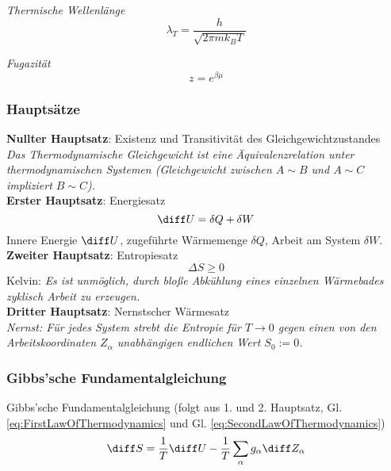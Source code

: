 \documentclass[11pt]{article}
\numberwithin{equation}{section}
\begin{document}
        \emph{Thermische Wellenlänge}
        \begin{equation}
          \lambda_T = \frac{h}{\sqrt{2\pi m k_B T}}
        \end{equation}

        \emph{Fugazität}
        \begin{equation}
          z = e^{\beta\mu}
        \end{equation}

      \subsubsection{Hauptsätze}
        \textbf{Nullter Hauptsatz}: Existenz und Transitivität des Gleichgewichtzustandes\\
          \indent \emph{Das Thermodynamische Gleichgewicht ist eine Äquivalenzrelation unter thermodynamischen Systemen (Gleichgewicht zwischen $A \sim B$ und $A \sim C$ impliziert $ B \sim C$).} \\
        \textbf{Erster Hauptsatz}: Energiesatz\\
          \begin{equation}
            \label{eq:FirstLawOfThermodynamics}
            \diff U = \delta Q + \delta W
          \end{equation}
          \indent Innere Energie $\diff U$, zugeführte Wärmemenge $\delta Q$, Arbeit am System $\delta W$.\\
        \textbf{Zweiter Hauptsatz}: Entropiesatz\\
          \begin{equation}
            \label{eq:SecondLawOfThermodynamics}
            \Delta S  \ge 0
          \end{equation}
          \indent Kelvin: \emph{Es ist unmöglich, durch bloße Abkühlung eines einzelnen Wärmebades zyklisch Arbeit zu erzeugen. }\\
        \textbf{Dritter Hauptsatz}: Nernstscher Wärmesatz\\
          \indent \emph{Nernst: Für jedes System strebt die Entropie für $T \rightarrow 0$ gegen einen von den Arbeitskoordinaten $Z_\alpha$ unabhängigen endlichen Wert $S_0:=0$.}

      \subsubsection{Gibbs'sche Fundamentalgleichung}
        Gibbs'sche Fundamentalgleichung (folgt aus 1. und 2. Hauptsatz, Gl. \ref{eq:FirstLawOfThermodynamics} und Gl. \ref{eq:SecondLawOfThermodynamics})
        \begin{equation}
          \label{eq:GibbsFundamental}
          \diff S = \frac{1}{T} \diff U - \frac{1}{T} \sum_{\alpha} g_\alpha \diff Z_\alpha
        \end{equation}
\end{document}
